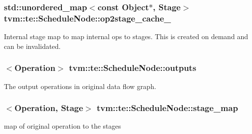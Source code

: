 \subsubsection[{\texorpdfstring{op2stage\+\_\+cache\+\_\+}{op2stage_cache_}}]{\setlength{\rightskip}{0pt plus 5cm}std\+::unordered\+\_\+map$<$const Object$\ast$, {\bf Stage}$>$ tvm\+::te\+::\+Schedule\+Node\+::op2stage\+\_\+cache\+\_\+}\hypertarget{classtvm_1_1te_1_1ScheduleNode_adbc8bfb6812add2173dcc7a6adb85d5c}{}\label{classtvm_1_1te_1_1ScheduleNode_adbc8bfb6812add2173dcc7a6adb85d5c}


Internal stage map to map internal ops to stages. This is created on demand and can be invalidated. 

\subsubsection[{\texorpdfstring{outputs}{outputs}}]{$<${\bf Operation}$>$ tvm\+::te\+::\+Schedule\+Node\+::outputs}\hypertarget{classtvm_1_1te_1_1ScheduleNode_a27b0f687f7b20fcc6416a49e041712d8}{}\label{classtvm_1_1te_1_1ScheduleNode_a27b0f687f7b20fcc6416a49e041712d8}


The output operations in original data flow graph. 

\subsubsection[{\texorpdfstring{stage\+\_\+map}{stage_map}}]{$<${\bf Operation}, {\bf Stage}$>$ tvm\+::te\+::\+Schedule\+Node\+::stage\+\_\+map}\hypertarget{classtvm_1_1te_1_1ScheduleNode_a612223aec2751cbd035a18c9e5453085}{}\label{classtvm_1_1te_1_1ScheduleNode_a612223aec2751cbd035a18c9e5453085}


map of original operation to the stages 

